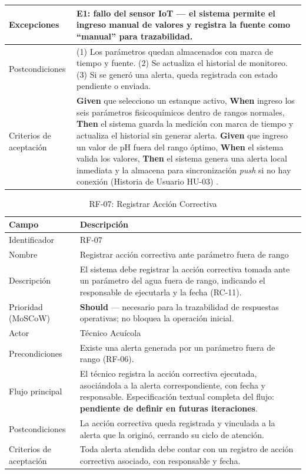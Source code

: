 \documentclass[12pt,a4paper]{article}
\begin{document}
\begin{longtable}{|p{3.6cm}|p{10.4cm}|}
Excepciones & \textbf{E1}: fallo del sensor IoT --- el sistema permite el
ingreso manual de valores y registra la fuente como ``manual'' para
trazabilidad. \\ \hline
Postcondiciones & (1) Los parámetros quedan almacenados con marca de tiempo y
fuente. (2) Se actualiza el historial de monitoreo. (3) Si se generó una
alerta, queda registrada con estado pendiente o enviada. \\ \hline
Criterios de aceptación &
\textbf{Given} que selecciono un estanque activo,
\textbf{When} ingreso los seis parámetros fisicoquímicos dentro de rangos
normales,
\textbf{Then} el sistema guarda la medición con marca de tiempo y actualiza el
historial sin generar alerta.
\textbf{Given} que ingreso un valor de pH fuera del rango óptimo,
\textbf{When} el sistema valida los valores,
\textbf{Then} el sistema genera una alerta local inmediata y la almacena para
sincronización \textit{push} si no hay conexión (Historia de Usuario HU-03)
\cite{Cohn2004}. \\ \hline
\end{longtable}

\begin{table}[H]
\centering
\caption{RF-07: Registrar Acción Correctiva}
\begin{tabular}{|p{3.6cm}|p{10.4cm}|}
\hline
\textbf{Campo} & \textbf{Descripción} \\
\hline
Identificador & RF-07 \\ \hline
Nombre & Registrar acción correctiva ante parámetro fuera de rango \\ \hline
Descripción & El sistema debe registrar la acción correctiva tomada ante un
parámetro del agua fuera de rango, indicando el responsable de ejecutarla y la
fecha (RC-11). \\ \hline
Prioridad (MoSCoW) & \textbf{Should} --- necesario para la trazabilidad de
respuestas operativas; no bloquea la operación inicial. \\ \hline
Actor & Técnico Acuícola \\ \hline
Precondiciones & Existe una alerta generada por un parámetro fuera de rango
(RF-06). \\ \hline
Flujo principal & El técnico registra la acción correctiva ejecutada,
asociándola a la alerta correspondiente, con fecha y responsable.
Especificación textual completa del flujo: \textbf{pendiente de definir en
futuras iteraciones}. \\ \hline
Postcondiciones & La acción correctiva queda registrada y vinculada a la
alerta que la originó, cerrando su ciclo de atención. \\ \hline
Criterios de aceptación & Toda alerta atendida debe contar con un registro de
acción correctiva asociado, con responsable y fecha. \\ \hline
\end{tabular}
\end{table}
\end{document}
